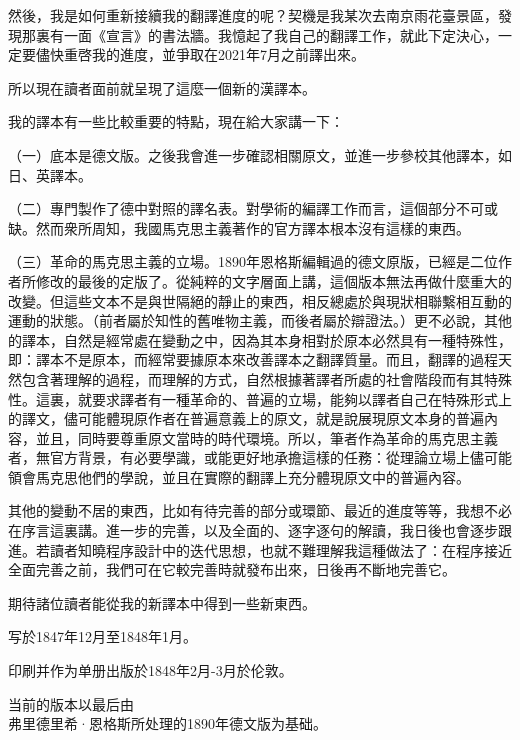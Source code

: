 \documentclass[a4paper,12pt]{ctexart}
\begin{document}
然後，我是如何重新接續我的翻譯進度的呢？契機是我某次去南京雨花臺景區，發現那裏有一面《宣言》的書法牆。我憶起了我自己的翻譯工作，就此下定決心，一定要儘快重啓我的進度，並爭取在2021年7月之前譯出來。

所以現在讀者面前就呈現了這麼一個新的漢譯本。

我的譯本有一些比較重要的特點，現在給大家講一下：

（一）底本是德文版。之後我會進一步確認相關原文，並進一步參校其他譯本，如日、英譯本。

（二）專門製作了德中對照的譯名表。對學術的編譯工作而言，這個部分不可或缺。然而衆所周知，我國馬克思主義著作的官方譯本根本沒有這樣的東西。

（三）革命的馬克思主義的立場。1890年恩格斯編輯過的德文原版，已經是二位作者所修改的最後的定版了。從純粹的文字層面上講，這個版本無法再做什麼重大的改變。但這些文本不是與世隔絕的靜止的東西，相反總處於與現狀相聯繫相互動的運動的狀態。（前者屬於知性的舊唯物主義，而後者屬於辯證法。）更不必說，其他的譯本，自然是經常處在變動之中，因為其本身相對於原本必然具有一種特殊性，即：譯本不是原本，而經常要據原本來改善譯本之翻譯質量。而且，翻譯的過程天然包含著理解的過程，而理解的方式，自然根據著譯者所處的社會階段而有其特殊性。這裏，就要求譯者有一種革命的、普遍的立場，能夠以譯者自己在特殊形式上的譯文，儘可能體現原作者在普遍意義上的原文，就是說展現原文本身的普遍內容，並且，同時要尊重原文當時的時代環境。所以，筆者作為革命的馬克思主義者，無官方背景，有必要學識，或能更好地承擔這樣的任務：從理論立場上儘可能領會馬克思他們的學說，並且在實際的翻譯上充分體現原文中的普遍內容。

其他的變動不居的東西，比如有待完善的部分或環節、最近的進度等等，我想不必在序言這裏講。進一步的完善，以及全面的、逐字逐句的解讀，我日後也會逐步跟進。若讀者知曉程序設計中的迭代思想，也就不難理解我這種做法了：在程序接近全面完善之前，我們可在它較完善時就發布出來，日後再不斷地完善它。

期待諸位讀者能從我的新譯本中得到一些新東西。

\newpage
\tableofcontents
\thispagestyle{empty}

\newpage
\thispagestyle{empty}

\begin{center}
写於1847年12月至1848年1月。

印刷并作为单册出版於1848年2月-3月於伦敦。

当前的版本以最后由\\弗里德里希·恩格斯所处理的1890年德文版为基础。
\end{center}
\end{document}
